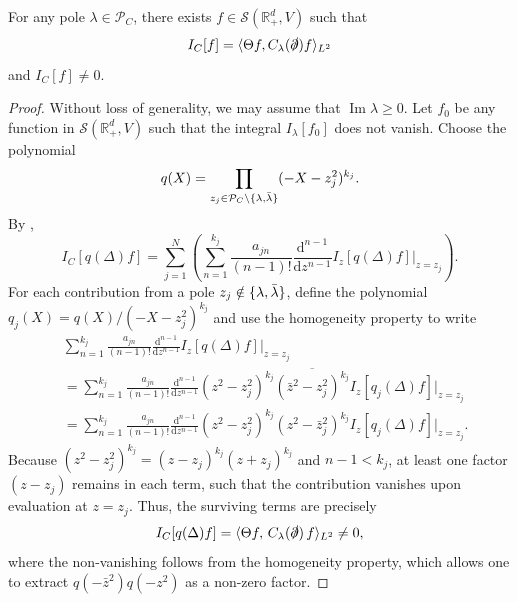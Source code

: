 \documentclass[10pt,a4paper,oneside,reqno]{amsart}
\newcommand{\reals}{\mathbb{R}}
\renewcommand{\Im}{\operatorname{Im}}
\begin{document}
\begin{lemma}\label{reduction lemma}
    For any pole $\lambda \in \mathcal P_C$, there exists $f \in \mathcal{S}(\reals^d_+, V)$ such that 
    \begin{equation}
        I_C[f] 
        = \langle \Theta f,C_\lambda(\slashed \partial) f\rangle_{L^2}
    \end{equation}
    and $I_C[f] \neq 0$.
\end{lemma}
\begin{proof} Without loss of generality, we may assume that $\Im \lambda\geq 0$. Let $f_0$ be any function in  $\mathcal{S}(\reals^d_+, V)$ such that the integral $I_\lambda[f_0]$ does not vanish. Choose the polynomial
\begin{equation}
	q(X)  = \prod_{z_j\in \mathcal P_C\setminus \{\lambda, \Bar{\lambda}\}} (-X-z_j^2)^{k_j}.
\end{equation}
By ,
\begin{equation}
	I_C[q(\Delta)f] =  \sum_{j=1}^{N} \left(\sum_{n=1}^{k_j}\frac{a_{jn}}{(n-1)!} 	\frac{\mathrm{d}^{n-1}}{\mathrm{d}z^{n-1} } I_{z}[q(\Delta)f]\Bigr|_{z=z_j}\right). 
\end{equation}
For each contribution from a pole $z_j \notin \{\lambda, \Bar{\lambda}\}$, define the polynomial $q_j(X) = q(X)/(-X-z_j^2)^{k_j}$ and use the homogeneity property to write
\begin{align}
&\sum_{n=1}^{k_j}\frac{a_{jn}}{(n-1)!} 	\frac{\mathrm{d}^{n-1}}{\mathrm{d}z^{n-1} } I_{z}[q(\Delta)f]\Bigr|_{z=z_j}\\
&= \sum_{n=1}^{k_j}\frac{a_{jn}}{(n-1)!} 	\frac{\mathrm{d}^{n-1}}{\mathrm{d}z^{n-1}}(z^2-z_j^2)^{k_j}\overline{(\bar{z}^2-z_j^2)^{k_j}} I_{z}[q_j(\Delta)f]\Bigr|_{z=z_j} \\
&= \sum_{n=1}^{k_j}\frac{a_{jn}}{(n-1)!} 	\frac{\mathrm{d}^{n-1}}{\mathrm{d}z^{n-1}}(z^2-z_j^2)^{k_j}{(z^2-\bar{z}_j^2)}^{k_j} I_{z}[q_j(\Delta)f]\Bigr|_{z=z_j}. 
\end{align}
Because $(z^2-z_j^2)^{k_j} =(z-z_j)^{k_j}(z+z_j)^{k_j} $ and $n-1 <k_j$, at least one factor $(z-z_j)$ remains in each term, such that the contribution vanishes upon evaluation at $z= z_j$.   
Thus, the surviving terms are precisely
\begin{equation}
    I_C[q(\Delta)f] = \langle \Theta f,\, C_\lambda(\slashed{\partial})\, f \rangle_{L^2} \neq 0,
\end{equation}
where the non-vanishing follows from the homogeneity property, which allows one to extract $q(-\bar{z}^2)q(-z^2)$ as a non-zero factor.
\end{proof}
\end{document}
